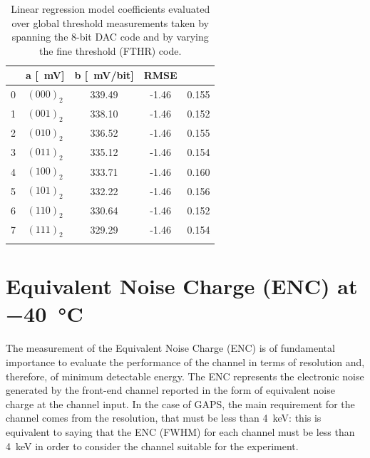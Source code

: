 \begin{table}[h!]
    \centering
    \begin{tabular}{c c c c c} 
        \Xhline{2\arrayrulewidth}
        \multicolumn{2}{c}{FTHR} & a [\SI{}{\milli\volt}] & b [\SI{}{\milli\volt/bit}] & RMSE \T\B \\
        \hline
        0 & $(000)_{2}$ & 339.49 & -1.46 & 0.155 \T\B \\
        1 & $(001)_{2}$ & 338.10 & -1.46 & 0.152 \T\B \\
        2 & $(010)_{2}$ & 336.52 & -1.46 & 0.155 \T\B \\
        3 & $(011)_{2}$ & 335.12 & -1.46 & 0.154 \T\B \\
        4 & $(100)_{2}$ & 333.71 & -1.46 & 0.160 \T\B \\
        5 & $(101)_{2}$ & 332.22 & -1.46 & 0.156 \T\B \\
        6 & $(110)_{2}$ & 330.64 & -1.46 & 0.152 \T\B \\
        7 & $(111)_{2}$ & 329.29 & -1.46 & 0.154 \T\B \\
        \Xhline{2\arrayrulewidth}
    \end{tabular}
    \caption{Linear regression model coefficients evaluated over global threshold measurements taken by spanning the 8-bit DAC code and by varying the fine threshold (FTHR) code.}
    \label{tabDAClinearmodel3}
\end{table}



\section{Equivalent Noise Charge (ENC) at \SI{-40}{\celsius}} \label{ENC} %
The measurement of the Equivalent Noise Charge (ENC) is of fundamental importance to evaluate the performance of the channel in terms of resolution and, therefore, of minimum detectable energy. The ENC represents the electronic noise generated by the front-end channel reported in the form of equivalent noise charge at the channel input. In the case of GAPS, the main requirement for the channel comes from the resolution, that must be less than \SI{4}{\kilo\electronvolt}: this is equivalent to saying that the ENC (FWHM) for each channel must be less than \SI{4}{\kilo\electronvolt} in order to consider the channel suitable for the experiment.

